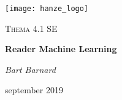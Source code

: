 \begin{titlepage}
	\centering
	\texttt{[image: hanze\_logo]}\par\vspace{1cm}
	\vspace{4cm}
	{\scshape\Large Thema 4.1 SE\par}
	\vspace{1.5cm}
	{\huge\bfseries Reader Machine Learning\par}
	\vspace{2cm}
	{\Large\itshape Bart Barnard\par}
	\vfill
	
	{\large september 2019\par}
\end{titlepage}

\tableofcontents
\newpage
